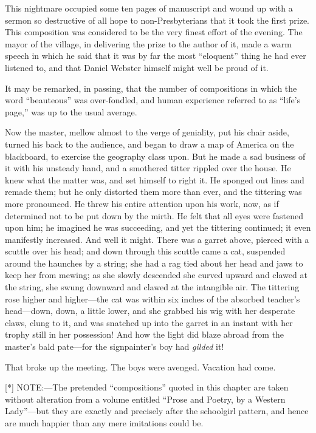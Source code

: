 \documentclass{book}
\begin{document}
This nightmare occupied some ten pages of manuscript and wound up with a sermon so destructive of all hope to non-Presbyterians that it took the first prize. This composition was considered to be the very finest effort of the evening. The mayor of the village, in delivering the prize to the author of it, made a warm speech in which he said that it was by far the most “eloquent” thing he had ever listened to, and that Daniel Webster himself might well be proud of it.

It may be remarked, in passing, that the number of compositions in which the word “beauteous” was over-fondled, and human experience referred to as “life’s page,” was up to the usual average.

Now the master, mellow almost to the verge of geniality, put his chair aside, turned his back to the audience, and began to draw a map of America on the blackboard, to exercise the geography class upon. But he made a sad business of it with his unsteady hand, and a smothered titter rippled over the house. He knew what the matter was, and set himself to right it. He sponged out lines and remade them; but he only distorted them more than ever, and the tittering was more pronounced. He threw his entire attention upon his work, now, as if determined not to be put down by the mirth. He felt that all eyes were fastened upon him; he imagined he was succeeding, and yet the tittering continued; it even manifestly increased. And well it might. There was a garret above, pierced with a scuttle over his head; and down through this scuttle came a cat, suspended around the haunches by a string; she had a rag tied about her head and jaws to keep her from mewing; as she slowly descended she curved upward and clawed at the string, she swung downward and clawed at the intangible air. The tittering rose higher and higher—the cat was within six inches of the absorbed teacher’s head—down, down, a little lower, and she grabbed his wig with her desperate claws, clung to it, and was snatched up into the garret in an instant with her trophy still in her possession! And how the light did blaze abroad from the master’s bald pate—for the signpainter’s boy had \emph{gilded} it!

That broke up the meeting. The boys were avenged. Vacation had come.

[*] NOTE:—The pretended “compositions” quoted in this chapter are taken without alteration from a volume entitled “Prose and Poetry, by a Western Lady”—but they are exactly and precisely after the schoolgirl pattern, and hence are much happier than any mere imitations could be.
\end{document}
